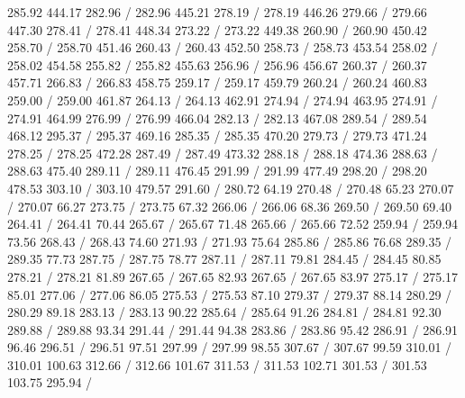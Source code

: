 { 285.92 444.17 282.96 /
 282.96 445.21 278.19 /
 278.19 446.26 279.66 /
 279.66 447.30 278.41 /
 278.41 448.34 273.22 /
 273.22 449.38 260.90 /
 260.90 450.42 258.70 /
 258.70 451.46 260.43 /
 260.43 452.50 258.73 /
 258.73 453.54 258.02 /
 258.02 454.58 255.82 /
 255.82 455.63 256.96 /
 256.96 456.67 260.37 /
 260.37 457.71 266.83 /
 266.83 458.75 259.17 /
 259.17 459.79 260.24 /
 260.24 460.83 259.00 /
 259.00 461.87 264.13 /
 264.13 462.91 274.94 /
 274.94 463.95 274.91 /
 274.91 464.99 276.99 /
 276.99 466.04 282.13 /
 282.13 467.08 289.54 /
 289.54 468.12 295.37 /
 295.37 469.16 285.35 /
 285.35 470.20 279.73 /
 279.73 471.24 278.25 /
 278.25 472.28 287.49 /
 287.49 473.32 288.18 /
 288.18 474.36 288.63 /
 288.63 475.40 289.11 /
 289.11 476.45 291.99 /
 291.99 477.49 298.20 /
 298.20 478.53 303.10 /
 303.10 479.57 291.60 /
\setsolid
{} 280.72 64.19 270.48 /
 270.48 65.23 270.07 /
 270.07 66.27 273.75 /
 273.75 67.32 266.06 /
 266.06 68.36 269.50 /
 269.50 69.40 264.41 /
 264.41 70.44 265.67 /
 265.67 71.48 265.66 /
 265.66 72.52 259.94 /
 259.94 73.56 268.43 /
 268.43 74.60 271.93 /
 271.93 75.64 285.86 /
 285.86 76.68 289.35 /
 289.35 77.73 287.75 /
 287.75 78.77 287.11 /
 287.11 79.81 284.45 /
 284.45 80.85 278.21 /
 278.21 81.89 267.65 /
 267.65 82.93 267.65 /
 267.65 83.97 275.17 /
 275.17 85.01 277.06 /
 277.06 86.05 275.53 /
 275.53 87.10 279.37 /
 279.37 88.14 280.29 /
 280.29 89.18 283.13 /
 283.13 90.22 285.64 /
 285.64 91.26 284.81 /
 284.81 92.30 289.88 /
 289.88 93.34 291.44 /
 291.44 94.38 283.86 /
 283.86 95.42 286.91 /
 286.91 96.46 296.51 /
 296.51 97.51 297.99 /
 297.99 98.55 307.67 /
 307.67 99.59 310.01 /
 310.01 100.63 312.66 /
 312.66 101.67 311.53 /
 311.53 102.71 301.53 /
 301.53 103.75 295.94 /
}

